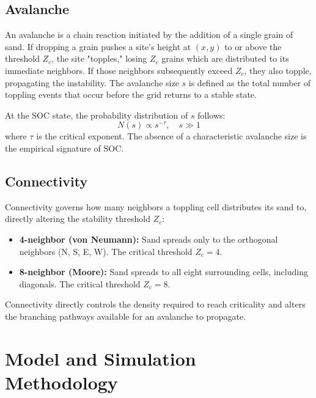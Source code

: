 \documentclass[11pt, a4paper]{article}
\begin{document}
\subsection{Avalanche}
An avalanche is a chain reaction initiated by the addition of a single grain of sand. If dropping a grain pushes a site's height at $(x, y)$ to or above the threshold $Z_c$, the site "topples," losing $Z_c$ grains which are distributed to its immediate neighbors. If those neighbors subsequently exceed $Z_c$, they also topple, propagating the instability. The avalanche size $s$ is defined as the total number of toppling events that occur before the grid returns to a stable state. 

At the SOC state, the probability distribution of $s$ follows:
\begin{equation}
N(s) \propto s^{-\tau}, \quad s \gg 1
\end{equation}
where $\tau$ is the critical exponent. The absence of a characteristic avalanche size is the empirical signature of SOC.

\subsection{Connectivity}
Connectivity governs how many neighbors a toppling cell distributes its sand to, directly altering the stability threshold $Z_c$:
\begin{itemize}
    \item \textbf{4-neighbor (von Neumann):} Sand spreads only to the orthogonal neighbors (N, S, E, W). The critical threshold $Z_c = 4$.
    \item \textbf{8-neighbor (Moore):} Sand spreads to all eight surrounding cells, including diagonals. The critical threshold $Z_c = 8$.
\end{itemize}
Connectivity directly controls the density required to reach criticality and alters the branching pathways available for an avalanche to propagate.

\section{Model and Simulation Methodology}
\end{document}
